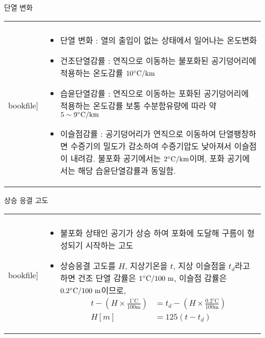 \begin{frame}[t]{단열 변화}
	\begin{tabular}{ll}
		\begin{minipage}[t]{.4\textwidth}
			\begin{figure}{}
				\texttt{[image: \\bookfile]} 
			\end{figure}
		\end{minipage}
		&
		\begin{minipage}[t]{.55\textwidth}	
			\begin{itemize} \scriptsize 
				\item 	단열 변화 : 열의 출입이 없는 상태에서 일어나는 온도변화
				\item 	건조단열감률 : 연직으로 이동하는 불포화된 공기덩어리에 적용하는 온도감률 $10 \rm{{^\circ}C/km}$
				\item 	습윤단열감률 : 연직으로 이동하는 포화된 공기덩어리에 적용하는 온도감률 보통 수분함유량에 따라 약 $5\sim9 \rm{{^\circ}C/km}$
				\item 	이슬점감률 : 공기덩어리가 연직으로 이동하여 단열팽창하면 수증기의 밀도가 감소하여 수증기압도 낮아져서 이슬점이 내려감. 불포화 공기에서는 $2 \rm{{^\circ}C/km}$이며, 포화 공기에서는 해당 습윤단열감률과 동일함. 
			\end{itemize}	

		\end{minipage}
	\end{tabular}
\end{frame}



\begin{frame}[t]{상승 응결 고도}
	\begin{tabular}{ll}
		\begin{minipage}[t]{.4\textwidth}
			\begin{figure}{}
				\texttt{[image: \\bookfile]} 
			\end{figure}
		\end{minipage}
		&
		\begin{minipage}[t]{.55\textwidth}
			\begin{itemize} \scriptsize 
				\item 불포화 상태인 공기가 상승 하여 포화에 도달해 구름이 형성되기 시작하는 고도
				\item 상승응결 고도를 $H$, 지상기온을 $t$, 지상 이슬점을 $t_d$라고 하면 건조 단열 감률은 $1 \rm{{^\circ}C/100~m}$, 이슬점 감률은 $0.2 \rm{{^\circ}C/100~m}$이므로, 
				$${\displaystyle {
					\begin{aligned}
					t-\left(H \times \frac{1^{\circ} \mathrm{C}}{100 \mathrm{m}}\right)&=t_{d}-\left(H \times \frac{0.2^{\circ} \mathrm{C}}{100 \mathrm{m}}\right) \\
					H[{m}]&=125\left({t}-{t}_{d}\right)
					\end{aligned}
				}	}$$
			\end{itemize}			
		\end{minipage}
	\end{tabular}
\end{frame}





